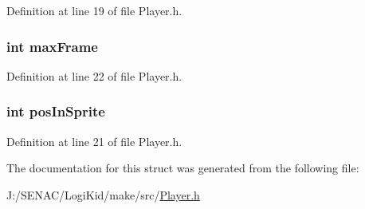Definition at line 19 of file Player.\-h.

\hypertarget{struct_image_a317d3b63a750c601fa4f8cde6d156c93}{
\subsubsection[{max\-Frame}]{\setlength{\rightskip}{0pt plus 5cm}int max\-Frame}}\label{struct_image_a317d3b63a750c601fa4f8cde6d156c93}


Definition at line 22 of file Player.\-h.

\hypertarget{struct_image_aae057d23d1a222c7f7557af8d3795684}{
\subsubsection[{pos\-In\-Sprite}]{\setlength{\rightskip}{0pt plus 5cm}int pos\-In\-Sprite}}\label{struct_image_aae057d23d1a222c7f7557af8d3795684}


Definition at line 21 of file Player.\-h.



The documentation for this struct was generated from the following file\-:\begin{DoxyCompactItemize}
\item 
J\-:/\-S\-E\-N\-A\-C/\-Logi\-Kid/make/src/\hyperlink{_player_8h}{Player.\-h}\end{DoxyCompactItemize}

